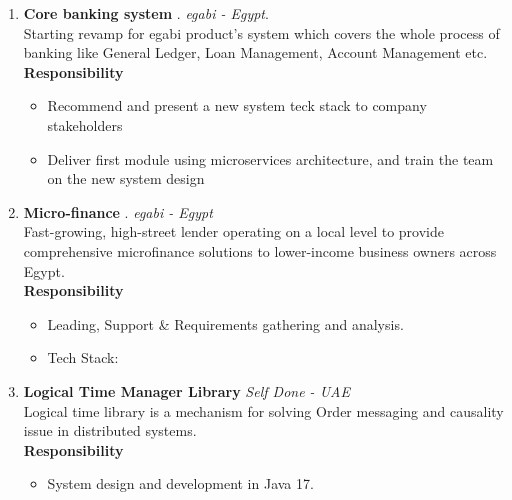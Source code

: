 \documentclass[%
               doublesided,
               paper=a4,
               fontsize=10pt
              ]{my-resume}
\begin{document}
\begin{enumerate}
		\item \textbf{\color{cyan}Core banking system \faBank}. \hfill \textit{egabi - Egypt\faMapMarker}. \\
		Starting revamp for egabi product's system which covers the whole process of banking like General Ledger, Loan Management, Account Management etc.\\
		\textbf{Responsibility} 
		\begin{itemize}
			\setlength\itemsep{.001em}
			\item Recommend and present a new system teck stack to company stakeholders   		
			\item Deliver first module  using microservices architecture, and train the team on the new system design 
		\end{itemize}
		
		
		\item \textbf{\color{cyan} Micro-finance \faDollar}. \hfill \textit{egabi - Egypt \faMapMarker} \\
		Fast-growing, high-street lender operating on a local level to provide comprehensive microfinance solutions to lower-income business owners across Egypt.\\
		\textbf{Responsibility} 
		\begin{itemize}
			\setlength\itemsep{.001em}
			\item Leading, Support \& Requirements gathering and analysis.
			\item \color{accent} Tech Stack: 
		\end{itemize}
		
		\item \textbf{\color{cyan}Logical Time Manager Library \faCode} \hfill \textit{Self Done - UAE \faMapMarker}\\ 
		Logical time library is a mechanism for solving Order messaging and causality issue in distributed systems. \\ 
		\textbf{Responsibility} 
		\begin{itemize}
			\setlength\itemsep{.001em}
			\item System design and development in Java 17.		\hfill {}					
		\end{itemize}
		
	\end{enumerate}
\end{document}
